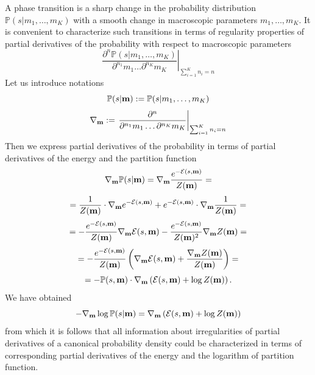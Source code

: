 \documentclass[aps,a4paper,twocolumn,showpacs]{revtex4}
\begin{document}
\par A phase transition is a sharp change in the probability distribution $\mathbb{P}(s|m_1, \dots, m_K)$ with a smooth change in macroscopic parameters $m_1, \dots, m_K$. It is convenient to characterize such transitions in terms of regularity properties of partial derivatives of the probability  with respect to macroscopic parameters
$$
\left. \frac{\partial^{n} \mathbb{P}(s|m_1, \dots, m_K)}{\partial^{n_1}m_{1} \dots \partial^{n_K}m_{K}}\right|_{\sum_{i=1}^{K}n_i = n}
$$
Let us introduce notations
$$
\mathbb{P}(s|\bold{m}) := \mathbb{P}(s|m_1, \dots, m_K)
$$
$$
\nabla_{\bold{m}} := \left. \frac{\partial^{n}}{\partial^{n_1}m_{1} \dots \partial^{n_K}m_{K}}\right|_{\sum_{i=1}^{K}n_i = n} 
$$
Then we express partial derivatives of the probability in terms of partial derivatives of the energy and the partition function
$$
\nabla_{\bold{m}} \mathbb{P}(s|\bold{m}) = \nabla_{\bold{m}} \frac{e^{-\mathcal{E}(s, \bold{m})}}{Z(\bold{m})} =
$$
$$
= \frac{1}{Z(\bold{m})}\cdot \nabla_{\bold{m}} e^{-\mathcal{E}(s, \bold{m})} + e^{-\mathcal{E}(s, \bold{m})} \cdot \nabla_{\bold{m}} \frac{1}{Z(\bold{m})}=
$$
$$
= - \frac{e^{-\mathcal{E}(s, \bold{m})}}{Z(\bold{m})} \nabla_{\bold{m}} \mathcal{E}(s, \bold{m}) - \frac{e^{-\mathcal{E}(s, \bold{m})}}{Z(\bold{m})^{2}} \nabla_{\bold{m}}Z(\bold{m}) =
$$
$$
= - \frac{e^{-\mathcal{E}(s, \bold{m})}}{Z(\bold{m})} \left(\nabla_{\bold{m}} \mathcal{E}(s, \bold{m}) + \frac{\nabla_{\bold{m}} Z(\bold{m})}{Z(\bold{m})} \right) =
$$
$$
= - \mathbb{P}(s, \bold{m}) \cdot \nabla_{\bold{m}} \left(\mathcal{E}(s, \bold{m}) + \log Z(\bold{m}) \right).
$$
We have obtained
\begin{equation}
- \nabla_{\bold{m}} \log \mathbb{P}(s|\bold{m}) = \nabla_{\bold{m}} \left(\mathcal{E}(s, \bold{m}) + \log Z(\bold{m}) \right)
\label{regularity_of_probability}
\end{equation}
from which it is follows that all information about irregularities of partial derivatives of a canonical probability density could be characterized in terms of corresponding partial derivatives of the energy and the logarithm of partition function.
\end{document}
